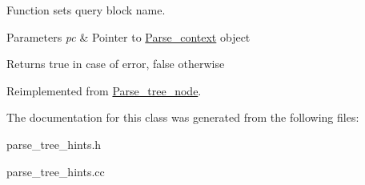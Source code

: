 Function sets query block name.


\begin{DoxyParams}{Parameters}
{\em pc} & Pointer to \mbox{\hyperlink{structParse__context}{Parse\+\_\+context}} object\\
\hline
\end{DoxyParams}
\begin{DoxyReturn}{Returns}
true in case of error, false otherwise 
\end{DoxyReturn}


Reimplemented from \mbox{\hyperlink{classParse__tree__node_a22d93524a537d0df652d7efa144f23da}{Parse\+\_\+tree\+\_\+node}}.



The documentation for this class was generated from the following files\+:\begin{DoxyCompactItemize}
\item 
parse\+\_\+tree\+\_\+hints.\+h\item 
parse\+\_\+tree\+\_\+hints.\+cc\end{DoxyCompactItemize}
